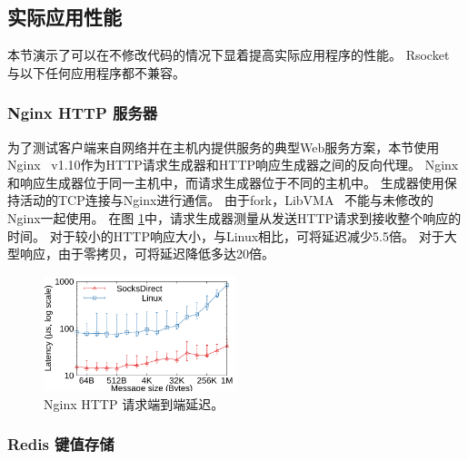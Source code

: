 \subsection{实际应用性能}
\label{socksdirect:subsec:application}


本节演示了\sys {}可以在不修改代码的情况下显着提高实际应用程序的性能。
Rsocket~ \cite {rsockets}与以下任何应用程序都不兼容。

\subsubsection{Nginx HTTP 服务器}



为了测试客户端来自网络并在主机内提供服务的典型Web服务方案，本节使用Nginx~ \cite {nginx} v1.10作为HTTP请求生成器和HTTP响应生成器之间的反向代理。
Nginx和响应生成器位于同一主机中，而请求生成器位于不同的主机中。
生成器使用保持活动的TCP连接与Nginx进行通信。
由于fork，LibVMA~ \cite {libvma}不能与未修改的Nginx一起使用。
在图 \ref {socksdirect:fig:eval-nginx}中，请求生成器测量从发送HTTP请求到接收整个响应的时间。
对于较小的HTTP响应大小，与Linux相比，\sys {}可将延迟减少5.5倍。
对于大型响应，由于零拷贝，\sys {}可将延迟降低多达20倍。

\begin{figure}[htbp]
	\centering \includegraphics[width=0.5\textwidth]{eval/web/msgsize-clocal-lat.pdf}
	
	\caption{Nginx HTTP 请求端到端延迟。}
	\label{socksdirect:fig:eval-nginx}
\end{figure}



\subsubsection{Redis 键值存储}

